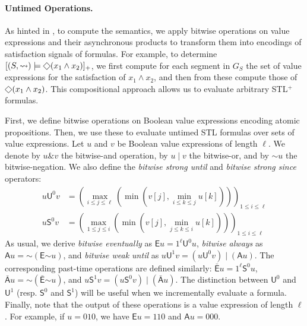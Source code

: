 \documentclass[iicol,lineno]{sn-jnl}
\renewcommand{\cref}{\Cref}
\newcommand{\hb}{\rightsquigarrow}
\newcommand*\BitAnd{\mathbin{\&}}
\newcommand*\BitOr{\mathbin{|}}
\newcommand*\BitNeg{\ensuremath{\mathord{\sim}}}
\renewcommand{\LTLf}{\LTLdiamond}
\let\LTLeventually\LTLf
\newcommand{\?}{\text{?}}
\begin{document}
	\paragraph*{Untimed Operations.}
	As hinted in \cref{ex:asyncprod}, to compute the semantics, we apply bitwise operations on value expressions and their asynchronous products to transform them into encodings of satisfaction signals of formulas.
	For example, to determine $[(S, {\hb}) \models \LTLeventually (x_1 \land x_2)]_+$, we first compute for each segment in $G_S$ the set of value expressions for the satisfaction of $x_1 \land x_2$, and then from these compute those of $\LTLeventually (x_1 \land x_2)$.
	This compositional approach allows us to evaluate arbitrary STL$^+$ formulas.
	
	\bgroup \color{red}
	First, we define bitwise operations on Boolean value expressions encoding atomic propositions.
	Then, we use these to evaluate untimed STL formulas over sets of value expressions.
	Let $u$ and $v$ be Boolean value expressions of length $\ell$.
	We denote by $u \BitAnd v$ the bitwise-and operation, by $u \BitOr v$ the bitwise-or, and by $\BitNeg u$ the bitwise-negation.
	We also define the \emph{bitwise strong until} and \emph{bitwise strong since} operators:
	\begin{align*}
		u \mathsf{U}^0 v &= \left( \max_{i \leq j \leq \ell} \left( \min \left( v[j], \min_{i \leq k \leq j} u[k] \right) \right) \right)_{1 \leq i \leq \ell} \\
		u \mathsf{S}^0 v &= \left( \max_{1 \leq j \leq i} \left( \min \left( v[j], \min_{j \leq k \leq i} u[k] \right) \right) \right)_{1 \leq i \leq \ell}
	\end{align*}
	As usual, we derive \emph{bitwise eventually} as 
	$\mathsf{E} u = 1^\ell \mathsf{U}^0 u$, \emph{bitwise always} as $\mathsf{A} u = \BitNeg 
	(\mathsf{E} \BitNeg u)$, and \emph{bitwise weak until} as $u \mathsf{U}^1 v = (u \mathsf{U}^0 v) 
	\BitOr (\mathsf{A} u)$.
	The corresponding past-time operations are defined similarly:
	$\bar{\mathsf{E}} u = 1^\ell \mathsf{S}^0 u$,
	$\bar{\mathsf{A}} u = \BitNeg (\bar{\mathsf{E}} \BitNeg u)$, and 
	$u \mathsf{S}^1 v = (u \mathsf{S}^0 v) \BitOr (\bar{\mathsf{A}} u)$.
	The distinction between $\mathsf{U}^0$ and $\mathsf{U}^1$ (resp. $\mathsf{S}^0$ and $\mathsf{S}^1$) will be useful when we incrementally evaluate a formula.
	Finally, note that the output of these operations is a value expression of length $\ell$.
	For example, if $u = 010$, we have $\mathsf{E} u = 110$ and $\mathsf{A} u = 000$.
	\egroup
	
\end{document}
